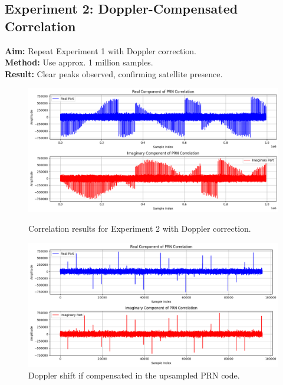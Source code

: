 \documentclass[12pt]{report}
\begin{document}
\subsection{Experiment 2: Doppler-Compensated Correlation}
\textbf{Aim:} Repeat Experiment 1 with Doppler correction. \\
\textbf{Method:} Use approx. 1 million samples. \\
\textbf{Result:} Clear peaks observed, confirming satellite presence.

\begin{figure}[H]
    \centering
    \begin{minipage}{0.48\textwidth}
        \centering
        \includegraphics[width=\textwidth]{exp2.png}
        \caption{Correlation results for Experiment 2 with Doppler correction.}
        \label{fig:exp2}
    \end{minipage}
    \hfill
    \begin{minipage}{0.48\textwidth}
        \centering
        \includegraphics[width=\textwidth]{exp2_a.png}
        \caption{Doppler shift if compensated in the upsampled PRN code.}
        \label{fig:exp2_a}
    \end{minipage}
\end{figure}
\end{document}
